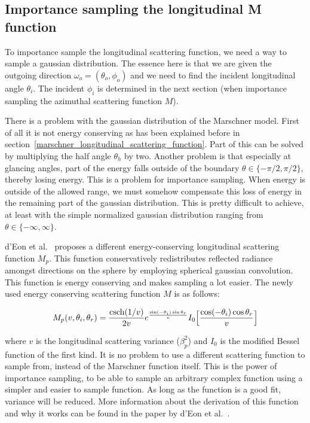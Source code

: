 \documentclass[11pt,a4paper]{report}
\begin{document}
\subsection{Importance sampling the longitudinal M function}
\label{sec_importance_sampling_M}

To importance sample the longitudinal scattering function, we need a way to sample a gaussian distribution. The essence here is that we are given the outgoing direction $\omega_o = (\theta_o, \phi_o)$ and we need to find the incident longitudinal angle $\theta_i$. The incident $\phi_i$ is determined in the next section (when importance sampling the azimuthal scattering function $M$).

There is a problem with the gaussian distribution of the Marschner model. First of all it is not energy conserving as has been explained before in section~\ref{marschner_longitudinal_scattering_function}. Part of this can be solved by multiplying the half angle $\theta_h$ by two. Another problem is that especially at glancing angles, part of the energy falls outside of the boundary $\theta \in \{ -\pi/2, \pi/2 \}$, thereby losing energy. This is a problem for importance sampling. When energy is outside of the allowed range, we must somehow compensate this loss of energy in the remaining part of the gaussian distribution. This is pretty difficult to achieve, at least with the simple normalized gaussian distribution ranging from $\theta \in \{ -\infty, \infty \}$.

d'Eon et al.~\cite{eon2011} proposes a different energy-conserving longitudinal scattering function $M_p$. This function conservatively redistributes reflected radiance amongst directions on the sphere by employing spherical gaussian convolution. This function is energy conserving and makes sampling a lot easier. The newly used energy conserving scattering function $M$ is as follows:

\begin{equation}
M_p(v, \theta_i, \theta_r) = \frac{\textnormal{csch}(1/v)}{2v} e^{\frac{\sin(-\theta_i)\sin\theta_r}{v}} I_0 \Big [ \frac{\cos(-\theta_i) \cos \theta_r}{v} \Big ]
\end{equation}

where $v$ is the longitudinal scattering variance ($\beta_p^2$) and $I_0$ is the modified Bessel function of the first kind. It is no problem to use a different scattering function to sample from, instead of the Marschner function itself. This is the power of importance sampling, to be able to sample an arbitrary complex function using a simpler and easier to sample function. As long as the function is a good fit, variance will be reduced. More information about the derivation of this function and why it works can be found in the paper by d'Eon et al.~\cite{eon2011}.\\
\end{document}
